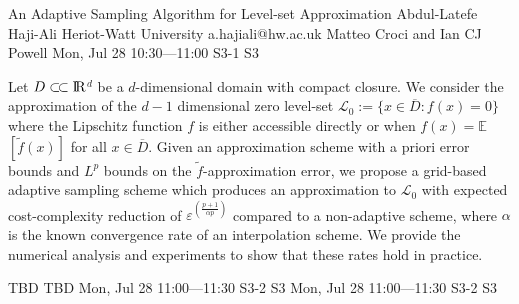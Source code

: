 \begin{talk}
  {An Adaptive Sampling Algorithm for Level-set Approximation}%
  {Abdul-Latefe Haji-Ali}%
  {Heriot-Watt University}%
  {a.hajiali@hw.ac.uk}%
  {Matteo Croci and Ian CJ Powell}%
  {}%
  {Mon, Jul 28 10:30---11:00}%
  {S3-1}%
  {S3}%
  {}%
    

  Let $D\subset\joinrel\subset\rm{I\!R}$$^d$ be a $d$-dimensional domain with compact
closure. We consider the approximation of the $d-1$ dimensional zero level-set
$\mathcal{L}_0 := \{x \in \overline{D} : f(x) = 0\}$ where the Lipschitz function $f$ is either
accessible directly or when $f(x) = \mathbb{E}$$\left[\tilde{f}(x)\right]$ for
all $x \in \overline{D}$. Given an approximation scheme with a priori error bounds
and $L^p$ bounds on the $\tilde{f}$-approximation error, we propose a
grid-based adaptive sampling scheme which produces an approximation to $\mathcal{L}_0$
with expected cost-complexity reduction of $\varepsilon^{\left(\frac{p+1}{\alpha p}\right)}$
compared to a non-adaptive scheme, where $\alpha$ is the known convergence rate of
an interpolation scheme. We provide the numerical analysis and experiments to
show that these rates hold in practice.

\medskip


\end{talk}

\begin{talk}
  {TBD}%
  {TBD}%
  {Mon, Jul 28 11:00---11:30}%
  {S3-2}%
  {S3}%
  {}%
  {Mon, Jul 28 11:00---11:30}%
  {S3-2}%
  {S3}%
\end{talk}

